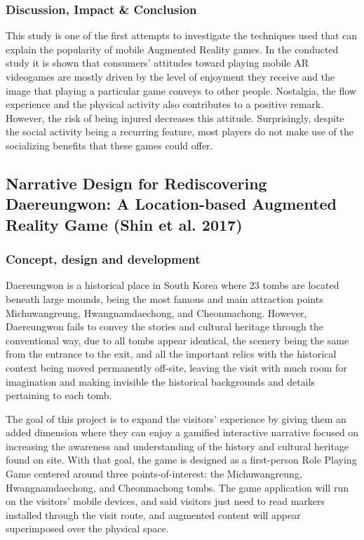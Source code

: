\documentclass[runningheads]{llncs}
\begin{document}
\subsubsection{Discussion, Impact \& Conclusion}
\par This study is one of the first attempts to investigate the techniques used that can explain the popularity of mobile Augmented Reality games. In the conducted study it is shown that consumers' attitudes toward playing mobile AR videogames are mostly driven by the level of enjoyment they receive and the image that playing a particular game conveys to other people. Nostalgia, the flow experience and the physical activity also contributes to a positive remark. However, the risk of being injured decreases this attitude. Surprisingly, despite the social activity being a recurring feature, most players do not make use of the socializing benefits that these games could offer.



\subsection{Narrative Design for Rediscovering Daereungwon: A Location-based Augmented Reality Game (Shin et al. 2017)}

\subsubsection{Concept, design and development}
\par Daereungwon is a historical place in South Korea where 23 tombs are located beneath large mounds, being the most famous and main attraction points Michuwangreung, Hwangnamdaechong, and Cheonmachong. However, Daereungwon fails to convey the stories and cultural heritage through the conventional way, due to all tombs appear identical, the scenery being the same from the entrance to the exit, and all the important relics with the historical context being moved permanently 
off-site, leaving the visit with much room for imagination and making invisible the historical backgrounds and details pertaining to each tomb.
\par The goal of this project is to expand the visitors' experience by giving them an added dimension where they can enjoy a gamified interactive narrative focused on increasing the awareness and understanding of the history and cultural heritage found on site. With that goal, the game is designed as a first-person Role Playing Game centered around three points-of-interest: the Michuwangreung,  Hwangnamdaechong, and Cheonmachong tombs. The game application will run on the visitors' mobile devices, and said visitors just need to read markers installed through the visit route, and augmented content will appear superimposed over the physical space. 
\end{document}
